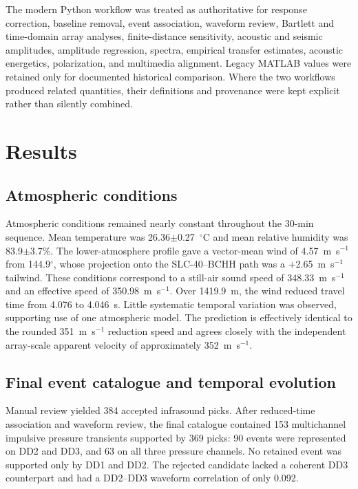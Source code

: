 \documentclass[]{seismica}
\begin{document}
The modern Python workflow was treated as authoritative for response
correction, baseline removal, event association, waveform review, Bartlett and
time-domain array analyses, finite-distance sensitivity, acoustic and seismic
amplitudes, amplitude regression, spectra, empirical transfer estimates,
acoustic energetics, polarization, and multimedia alignment. Legacy MATLAB
values were retained only for documented historical comparison. Where the two
workflows produced related quantities, their definitions and provenance were
kept explicit rather than silently combined.

\section{Results}
\label{sec:results}

\subsection{Atmospheric conditions}
\label{sec:results_atmosphere}

Atmospheric conditions remained nearly constant throughout the 30-min
sequence. Mean temperature was 26.36$\pm$0.27~$^\circ$C and mean relative
humidity was 83.9$\pm$3.7\%. The lower-atmosphere profile gave a vector-mean
wind of 4.57~m~s$^{-1}$ from 144.9$^\circ$, whose projection onto the
SLC-40--BCHH path was a +2.65~m~s$^{-1}$ tailwind. These conditions correspond
to a still-air sound speed of 348.33~m~s$^{-1}$ and an effective speed of
350.98~m~s$^{-1}$. Over 1419.9~m, the wind reduced travel time from 4.076 to
4.046~s. Little systematic temporal variation was observed, supporting use of
one atmospheric model. The prediction is effectively identical to the rounded
351~m~s$^{-1}$ reduction speed and agrees closely with the independent
array-scale apparent velocity of approximately 352~m~s$^{-1}$.


\subsection{Final event catalogue and temporal evolution}
\label{sec:results_catalogue}

Manual review yielded 384 accepted infrasound picks. After reduced-time
association and waveform review, the final catalogue contained 153
multichannel impulsive pressure transients
supported by 369 picks: 90 events were represented on DD2 and DD3, and 63 on
all three pressure channels. No retained event was supported only by DD1 and
DD2. The rejected candidate lacked a coherent DD3 counterpart and had a
DD2--DD3 waveform correlation of only 0.092.
\end{document}
